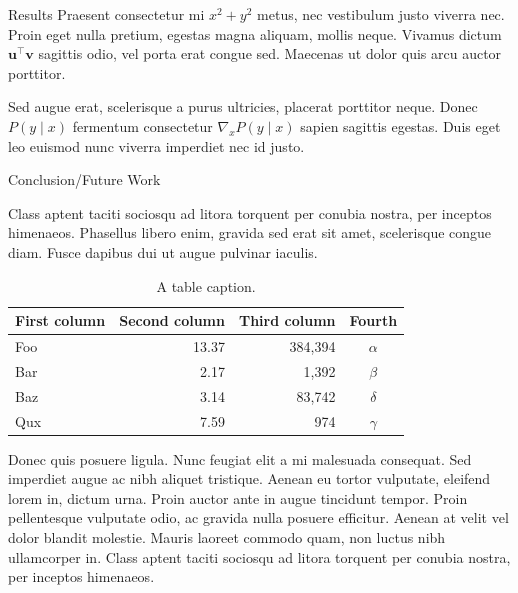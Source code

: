 \documentclass[final]{beamer}
\newlength{\colwidth}
\begin{document}
\begin{frame}[t]
\begin{columns}[t]
\begin{column}{\colwidth}
\begin{exampleblock}{Results}
    Praesent consectetur mi $x^2 + y^2$ metus, nec vestibulum justo viverra
    nec. Proin eget nulla pretium, egestas magna aliquam, mollis neque. Vivamus
    dictum $\mathbf{u}^\intercal\mathbf{v}$ sagittis odio, vel porta erat
    congue sed. Maecenas ut dolor quis arcu auctor porttitor.


    Sed augue erat, scelerisque a purus ultricies, placerat porttitor neque.
    Donec $P(y \mid x)$ fermentum consectetur $\nabla_x P(y \mid x)$ sapien
    sagittis egestas. Duis eget leo euismod nunc viverra imperdiet nec id
    justo.

  \end{exampleblock}

  \begin{block}{Conclusion/Future Work}

    Class aptent taciti sociosqu ad litora torquent per conubia nostra, per
    inceptos himenaeos. Phasellus libero enim, gravida sed erat sit amet,
    scelerisque congue diam. Fusce dapibus dui ut augue pulvinar iaculis.

    \begin{table}
      \centering
      \begin{tabular}{l r r c}
        \toprule
        \textbf{First column} & \textbf{Second column} & \textbf{Third column} & \textbf{Fourth} \\
        \midrule
        Foo & 13.37 & 384,394 & $\alpha$ \\
        Bar & 2.17 & 1,392 & $\beta$ \\
        Baz & 3.14 & 83,742 & $\delta$ \\
        Qux & 7.59 & 974 & $\gamma$ \\
        \bottomrule
      \end{tabular}
      \caption{A table caption.}
    \end{table}

    Donec quis posuere ligula. Nunc feugiat elit a mi malesuada consequat. Sed
    imperdiet augue ac nibh aliquet tristique. Aenean eu tortor vulputate,
    eleifend lorem in, dictum urna. Proin auctor ante in augue tincidunt
    tempor. Proin pellentesque vulputate odio, ac gravida nulla posuere
    efficitur. Aenean at velit vel dolor blandit molestie. Mauris laoreet
    commodo quam, non luctus nibh ullamcorper in. Class aptent taciti sociosqu
    ad litora torquent per conubia nostra, per inceptos himenaeos.


\end{block}
\end{column}
\end{columns}
\end{frame}
\end{document}
